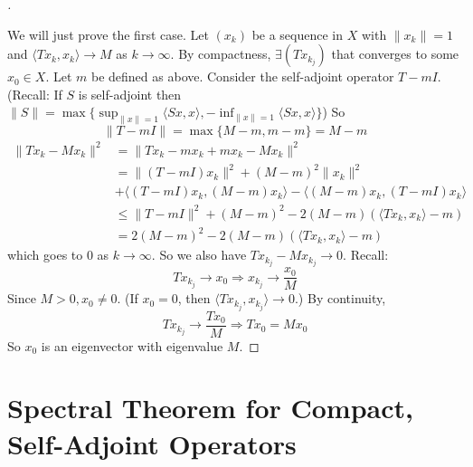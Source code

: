 \documentclass{article}
\theoremstyle{definition}
\newenvironment{proofs}[1][\proofname]{%
  \begin{proof}[#1]$ $\par\nobreak\ignorespaces
}{%
  \end{proof}
}
\begin{document}
\begin{proofs}
	We will just prove the first case.
	Let $(x_k)$ be a sequence in $X$ with $\|x_k\| = 1$ and $\langle T x_k, x_k \rangle \to M$ as $k \to \infty$.
	By compactness, $\exists (T x_{k_j})$ that converges to some $x_0 \in X$.
	Let $m$ be defined as above.
	Consider the self-adjoint operator $T - m I$.
	(Recall: If $S$ is self-adjoint then $\|S\| = \max\{ \sup_{\|x\| = 1} \langle Sx, x\rangle, -\inf_{\|x\| = 1} \langle S x, x \rangle\}$)
	So 
	\[
		\|T - mI\| = \max \{ M - m, m - m\} = M - m
	\]
	\[
		\begin{split}
			\|T x_k - M x_k\|^2 & = \|T x_k - m x_k + m x_k - M x_k\|^2\\
			& = \|(T - m I) x_k\|^2 + (M - m)^2 \|x_k\|^2 \\
			& + \langle (T - mI) x_k, (M - m) x_k \rangle - \langle (M - m) x_k, (T - mI) x_k \rangle\\
			& \leq \|T - mI\|^2 + (M - m)^2 - 2 (M - m)(\langle T x_k, x_k \rangle - m) \\
			& = 2(M - m)^2 - 2 (M - m)(\langle T x_k, x_k \rangle - m)
		\end{split}
	\]
	which goes to 0 as $k \to \infty$.
	So we also have $T x_{k_j} - M x_{k_j} \to 0$.
	Recall: 
	\[
		T x_{k_j} \to x_0 \Rightarrow x_{k_j} \to \frac{x_0}{M}
	\]
	Since $M > 0, x_0 \neq 0$.
	(If $x_0 = 0$, then $\langle T x_{k_j}, x_{k_j} \rangle \to 0$.)
	By continuity, 
	\[
		T x_{k_j} \to \frac{T x_0}{M} \Rightarrow T x_0 = M x_0
	\]
	So $x_0$ is an eigenvector with eigenvalue $M$.
\end{proofs}

\section{Spectral Theorem for Compact, Self-Adjoint Operators}
\end{document}
